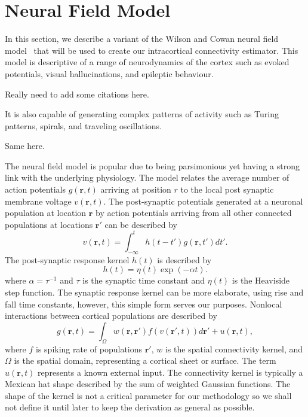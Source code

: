 \documentclass[onecolumn,draftcls]{IEEEtran}
\begin{document}
\section{Neural Field Model}
In this section, we describe a variant of the  Wilson and Cowan neural field model~\cite{Wilson1973} that will be used to create our intracortical connectivity estimator. This model is descriptive of a range of neurodynamics of the cortex such as evoked potentials, visual hallucinations, and epileptic behaviour. 
\begin{todo}
	{Really need to add some citations here.}
\end{todo}
It is also capable of generating complex patterns of activity such as Turing patterns, spirals, and traveling oscillations. 
\begin{todo}
	{Same here.}
\end{todo}
The neural field model is popular due to being parsimonious yet having a strong link with the underlying physiology. The model relates the average number of action potentials $g(\mathbf{r},t)$ arriving at position $r$ to the local post synaptic membrane voltage $v(\mathbf{r},t)$. The post-synaptic potentials generated at a neuronal population at location $\mathbf{r}$ by action potentials arriving from all other connected populations at locations $\mathbf{r}'$ can be described by
\begin{equation}\label{SpikesToPotential}
	v\left( {\mathbf{r},t} \right) = \int_{ - \infty }^t {h\left( {t - t'} \right)g\left( {\mathbf{r},t'} \right)dt'}.
\end{equation}
The post-synaptic response kernel $h(t)$ is described by
\begin{equation}\label{SynapticRespKernel}
	h(t) = \eta(t)\exp{\left(-\alpha t\right)}.
\end{equation}
where $\alpha=\tau^{-1}$ and $\tau$ is the synaptic time constant and $\eta(t)$ is the Heaviside step function. The synaptic response kernel can be more elaborate, using rise and fall time constants, however, this simple form serves our purposes. Nonlocal interactions between cortical populations are described by	
\begin{equation}\label{RateBasedInteractions}
	g\left( \mathbf{r},t \right) = \int_\Omega  {w\left( \mathbf{r},\mathbf{r}' \right)f\left( v\left( \mathbf{r}',t \right) \right)d\mathbf{r}'} + u\left(\mathbf{r},t\right),
\end{equation}
where $f$ is spiking rate of populations $\mathbf{r}'$, $w$ is the spatial connectivity kernel, and $\Omega$ is the spatial domain, representing a cortical sheet or surface. The term $u\left(\mathbf{r},t\right)$ represents a known external input. The connectivity kernel is typically a Mexican hat shape described by the sum of weighted Gaussian functions. The shape of the kernel is not a critical parameter for our methodology so we shall not define it until later to keep the derivation as general as possible.
\end{document}
